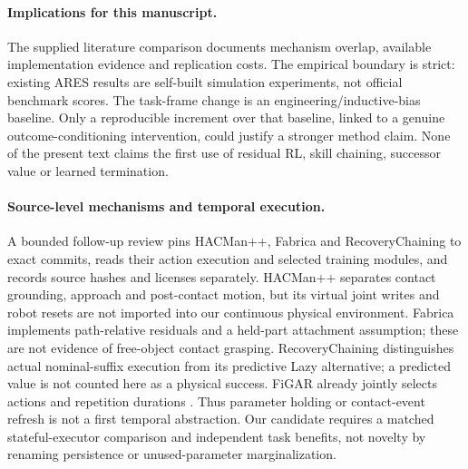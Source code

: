 \paragraph{Implications for this manuscript.}
The supplied literature comparison documents mechanism overlap, available implementation evidence and replication costs. The empirical boundary is strict: existing ARES results are self-built simulation experiments, not official benchmark scores. The task-frame change is an engineering/inductive-bias baseline. Only a reproducible increment over that baseline, linked to a genuine outcome-conditioning intervention, could justify a stronger method claim. None of the present text claims the first use of residual RL, skill chaining, successor value or learned termination.

\paragraph{Source-level mechanisms and temporal execution.}
A bounded follow-up review pins HACMan++, Fabrica and RecoveryChaining to exact commits, reads their action execution and selected training modules, and records source hashes and licenses separately. HACMan++ separates contact grounding, approach and post-contact motion, but its virtual joint writes and robot resets are not imported into our continuous physical environment. Fabrica implements path-relative residuals and a held-part attachment assumption; these are not evidence of free-object contact grasping. RecoveryChaining distinguishes actual nominal-suffix execution from its predictive Lazy alternative; a predicted value is not counted here as a physical success. FiGAR already jointly selects actions and repetition durations \cite{sharma2017figar}. Thus parameter holding or contact-event refresh is not a first temporal abstraction. Our candidate requires a matched stateful-executor comparison and independent task benefits, not novelty by renaming persistence or unused-parameter marginalization.
